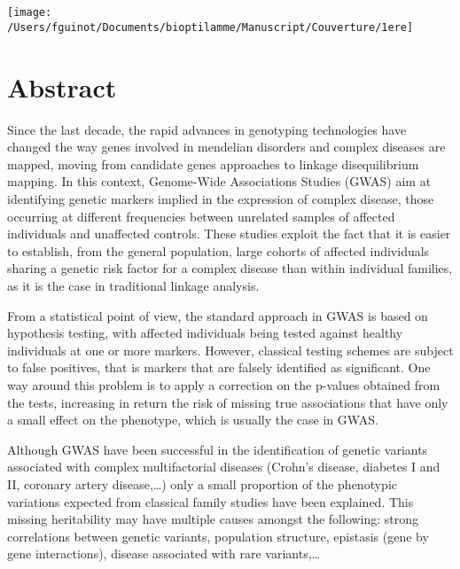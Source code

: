 \documentclass[]{book}
\title{}
\author{}
\date{}
\begin{document}
{
\setcounter{tocdepth}{1}
\tableofcontents
}
\hypertarget{section}{%
\chapter*{}\label{section}}

\begin{center}\texttt{[image: /Users/fguinot/Documents/bioptilamme/Manuscript/Couverture/1ere]} \end{center}

\hypertarget{abstract}{%
\chapter*{Abstract}\label{abstract}}

Since the last decade, the rapid advances in genotyping technologies have changed the way genes involved in mendelian disorders and complex diseases are mapped, moving from candidate genes approaches to linkage disequilibrium mapping. In this context, Genome-Wide Associations Studies (GWAS) aim at identifying genetic markers implied in the expression of complex disease, those occurring at different frequencies between unrelated samples of affected individuals and unaffected controls. These studies exploit the fact that it is easier to establish, from the general population, large cohorts of affected individuals sharing a genetic risk factor for a complex disease than within individual families, as it is the case in traditional linkage analysis.

From a statistical point of view, the standard approach in GWAS is based on hypothesis testing, with affected individuals being tested against healthy individuals at one or more markers. However, classical testing schemes are subject to false positives, that is markers that are falsely identified as significant. One way around this problem is to apply a correction on the p-values obtained from the tests, increasing in return the risk of missing true associations that have only a small effect on the phenotype, which is usually the case in GWAS.

Although GWAS have been successful in the identification of genetic variants associated with complex multifactorial diseases (Crohn's disease, diabetes I and II, coronary artery disease,\ldots{}) only a small proportion of the phenotypic variations expected from classical family studies have been explained. This missing heritability may have multiple causes amongst the following: strong correlations between genetic variants, population structure, epistasis (gene by gene interactions), disease associated with rare variants,\dots
\end{document}
